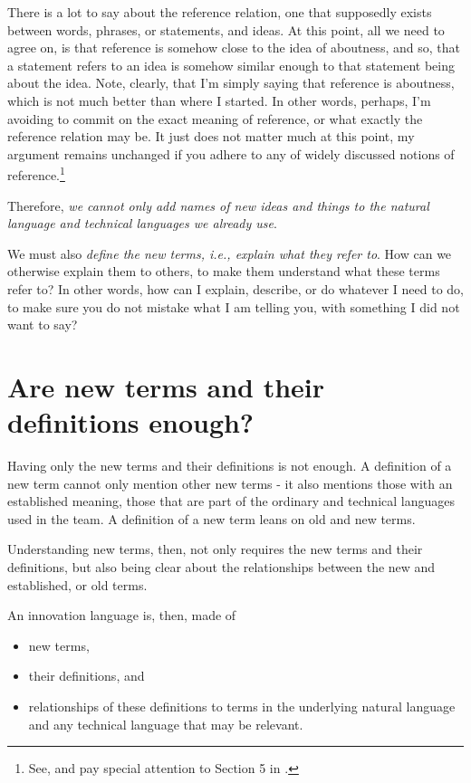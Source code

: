 There is a lot to say about the reference relation, one that supposedly exists between words, phrases, or statements, and ideas. At this point, all we need to agree on, is that reference is somehow close to the idea of aboutness, and so, that a statement refers to an idea is somehow similar enough to that statement being about the idea. Note, clearly, that I'm simply saying that reference is aboutness, which is not much better than where I started. In other words, perhaps, I'm avoiding to commit on the exact meaning of reference, or what exactly the reference relation may be. It just does not matter much at this point, my argument remains unchanged if you adhere to any of widely discussed notions of reference.\footnote{See, and pay special attention to Section 5 in \cite{Michaelson2019}.}

Therefore, \textit{we cannot only add names of new ideas and things to the natural language and technical languages we already use}. 

We must also \textit{define the new terms, i.e., explain what they refer to}. How can we otherwise explain them to others, to make them understand what these terms refer to? In other words, how can I explain, describe, or do whatever I need to do, to make sure you do not mistake what I am telling you, with something I did not want to say?


\section{Are new terms and their definitions enough?}
\label{c1-s10}
Having only the new terms and their definitions is not enough. A definition of a new term cannot only mention other new terms - it also mentions those with an established meaning, those that are part of the ordinary and technical languages used in the team. A definition of a new term leans on old and new terms.

Understanding new terms, then, not only requires the new terms and their definitions, but also being clear about the relationships between the new and established, or old terms. 

An innovation language is, then, made of 
\begin{itemize}
	\item{new terms,}
	\item{their definitions, and }
	\item{relationships of these definitions to terms in the underlying natural language and any technical language that may be relevant.}
\end{itemize}

